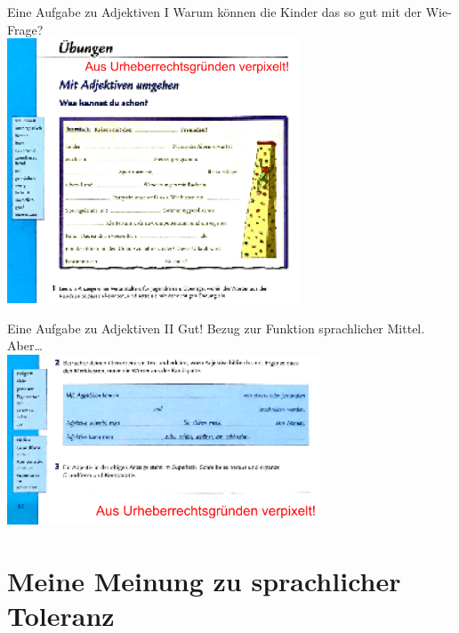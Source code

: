 \begin{frame}
  {Eine Aufgabe zu Adjektiven I}
  \pause
  Warum können die Kinder das so gut mit der Wie-Frage?\\
  \Halbzeile
  \pause
  \centering
  \includegraphics[width=0.65\textwidth]{graphics/adjektive1_blur}
\end{frame}

\begin{frame}
  {Eine Aufgabe zu Adjektiven II}
  Gut! Bezug zur Funktion sprachlicher Mittel. Aber\ldots\\
  \Zeile
  \pause
  \centering
  \includegraphics[width=0.7\textwidth]{graphics/adjektive2_blur}
\end{frame}

\section{Meine Meinung zu sprachlicher Toleranz}

